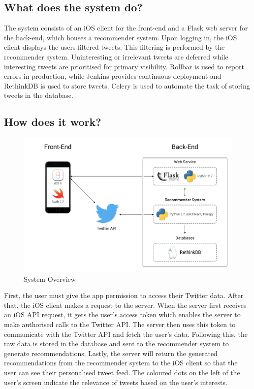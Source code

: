 \documentclass{article}
\begin{document}
\subsection{What does the system do?} %
The system consists of an iOS client for the front-end and a Flask\cite{flask} web server for the back-end, which houses a recommender system. Upon logging in, the iOS client displays the users filtered tweets. This filtering is performed by the recommender system. Uninteresting or irrelevant tweets are deferred while interesting tweets are prioritised for primary visibility. Rollbar is used to report errors in production, while Jenkins provides continuous deployment and RethinkDB is used to store tweets. Celery is used to automate the task of storing tweets in the database.
\subsection{How does it work?} %
\begin{figure}[H] 
    \centering
    \includegraphics[width=\textwidth]{system_overview}  
    \caption{System Overview}
\end{figure}

First, the user must give the app permission to access their Twitter data. After that, the iOS client makes a request to the server. When the server first receives an iOS API request, it gets the user's access token which enables the server to make authorised calls to the Twitter API. The server then uses this token to communicate with the Twitter API and fetch the user's data. Following this, the raw data is stored in the database and sent to the recommender system to generate recommendations. 
Lastly, the server will return the generated recommendations from the recommender system to the iOS client so that the user can see their personalised tweet feed. The coloured dots on the left of the user's screen indicate the relevance of tweets based on the user's interests.
\end{document}
